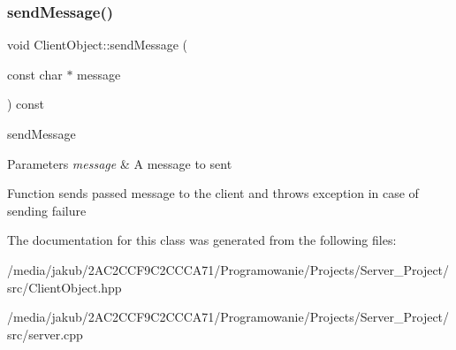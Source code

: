 \subsubsection{\texorpdfstring{send\+Message()}{sendMessage()}}
{\footnotesize\ttfamily void Client\+Object\+::send\+Message (\begin{DoxyParamCaption}\item[{const char $\ast$}]{message }\end{DoxyParamCaption}) const}



send\+Message 


\begin{DoxyParams}{Parameters}
{\em message} & A message to sent\\
\hline
\end{DoxyParams}
Function sends passed message to the client and throws exception in case of sending failure 

The documentation for this class was generated from the following files\+:\begin{DoxyCompactItemize}
\item 
/media/jakub/2\+A\+C2\+C\+C\+F9\+C2\+C\+C\+C\+A71/\+Programowanie/\+Projects/\+Server\+\_\+\+Project/src/Client\+Object.\+hpp\item 
/media/jakub/2\+A\+C2\+C\+C\+F9\+C2\+C\+C\+C\+A71/\+Programowanie/\+Projects/\+Server\+\_\+\+Project/src/server.\+cpp\end{DoxyCompactItemize}
